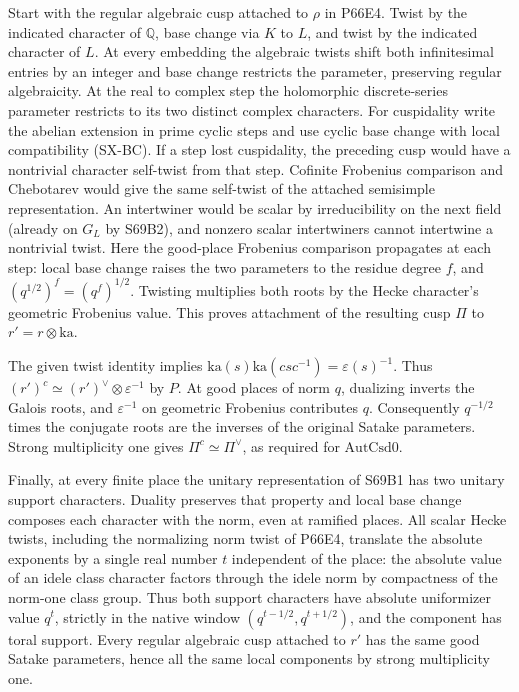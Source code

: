 Start with the regular algebraic cusp attached to $\rho$ in
P66E4. Twist by the indicated character of $\mathbb Q$, base
change via $K$ to $L$, and twist by the indicated character of
$L$. At every embedding the algebraic twists shift both
infinitesimal entries by an integer and base change restricts
the parameter, preserving regular algebraicity. At the real to
complex step the holomorphic discrete-series parameter restricts
to its two distinct complex characters. For cuspidality write
the abelian extension in prime cyclic steps and use cyclic base
change with local compatibility (SX-BC). If a step lost
cuspidality, the preceding cusp would have a nontrivial character
self-twist from that step. Cofinite Frobenius comparison and
Chebotarev would give the same self-twist of the attached
semisimple representation. An intertwiner would be scalar by
irreducibility on the next field (already on $G_L$ by S69B2),
and nonzero scalar intertwiners cannot intertwine a nontrivial
twist. Here the good-place Frobenius comparison propagates at
each step: local base change raises the two parameters to the
residue degree $f$, and $(q^{1/2})^f=(q^f)^{1/2}$. Twisting
multiplies both roots by the Hecke character's geometric
Frobenius value. This proves attachment of the resulting cusp
$\Pi$ to $r'=r\otimes\mathrm{ka}$.

The given twist identity implies
$\mathrm{ka}(s)\mathrm{ka}(csc^{-1})=\varepsilon(s)^{-1}$.
Thus $(r')^c\simeq(r')^\vee\otimes\varepsilon^{-1}$ by $P$.
At good places of norm $q$, dualizing inverts the Galois roots,
and $\varepsilon^{-1}$ on geometric Frobenius contributes $q$.
Consequently $q^{-1/2}$ times the conjugate roots are the inverses
of the original Satake parameters. Strong multiplicity one gives
$\Pi^c\simeq\Pi^\vee$, as required for $\mathrm{AutCsd0}$.

Finally, at every finite place the unitary representation of S69B1
has two unitary support characters. Duality preserves that property
and local base change composes each character with the norm,
even at ramified places. All scalar Hecke twists, including the
normalizing norm twist of P66E4, translate the absolute exponents
by a single real number $t$ independent of the place: the absolute
value of an idele class character factors through the idele norm
by compactness of the norm-one class group. Thus both support
characters have absolute uniformizer value $q^t$, strictly in
the native window $(q^{t-1/2},q^{t+1/2})$, and the component has
toral support. Every regular algebraic cusp attached to $r'$ has
the same good Satake parameters, hence all the same local
components by strong multiplicity one.

